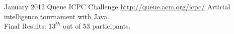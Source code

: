 \documentclass[11pt,a4paper]{moderncv}
\begin{document}

\cventry
{January 2012}
{Queue ICPC Challenge}
{}
{\url{http://queue.acm.org/icpc/}}
{}
{Articial intelligence tournament with Java.\\Final Results: $13^{th}$ out of 53 participants.}


\nocite{*}

\end{document}
